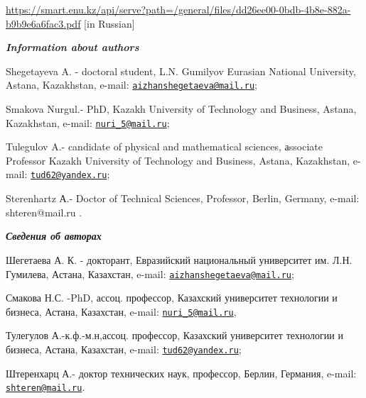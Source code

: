 \url{https://smart.enu.kz/api/serve?path=/general/files/dd26ee00-0bdb-4b8e-882a-b9b9e6a6fac3.pdf}
{[}in Russian{]}

\emph{{\bfseries Information about authors}}

Shegetayeva A. - doctoral student, L.N. Gumilyov Eurasian National
University, Astana, Kazakhstan, e-mail:
\href{mailto:aizhanshegetaeva@mail.ru}{\nolinkurl{aizhanshegetaeva@mail.ru}};

Smakova Nurgul.- PhD, Kazakh University of Technology and Business,
Astana, Kazakhstan, e-mail:
\href{mailto:nuri_5@mail.ru}{\nolinkurl{nuri\_5@mail.ru}};

Tulegulov A.- candidate of physical and mathematical sciences, аssociate
Professor Kazakh University of Technology and Business, Astana,
Kazakhstan, e-mail:
\href{mailto:tud62@yandex.ru}{\nolinkurl{tud62@yandex.ru}};

Sterenhartz А.- Doctor of Technical Sciences, Professor, Berlin,
Germany, e-mail: shteren@mail.ru .

\emph{{\bfseries Сведения об авторах}}

Шегетаева А. К. - докторант, Евразийский национальный университет им.
Л.Н. Гумилева, Астана, Казахстан, e-mail:
\href{mailto:aizhanshegetaeva@mail.ru}{\nolinkurl{aizhanshegetaeva@mail.ru}};

Смакова Н.С. -PhD, ассоц. профессор, Казахский университет технологии и
бизнеса, Астана, Казахстан, e-mail:
\href{mailto:nuri_5@mail.ru}{\nolinkurl{nuri\_5@mail.ru}},

Тулегулов А.-к.ф.-м.н,ассоц. профессор, Казахский университет технологии
и бизнеса, Астана, Казахстан, e-mail:
\href{mailto:tud62@yandex.ru}{\nolinkurl{tud62@yandex.ru}};

Штеренхарц А.- доктор технических наук, профессор, Берлин, Германия,
e-mail: \href{mailto:shteren@mail.ru}{\nolinkurl{shteren@mail.ru}}.\